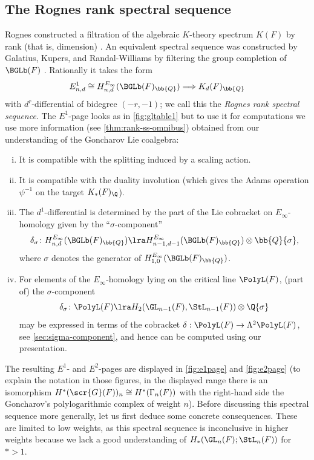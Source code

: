 \documentclass[a4paper]{amsart}
\begin{document}
\subsection{The Rognes rank spectral sequence} Rognes constructed a filtration of the algebraic $K$-theory spectrum $K(F)$ by rank (that is, dimension) \cite{Rognes}. An equivalent spectral sequence was constructed by Galatius, Kupers, and Randal-Williams by filtering the group completion of $\BGLb(F)$ \cite[Section 13.8]{GKRW18}. Rationally it takes the form
\[E^1_{n,d} \cong H^{E_\infty}_{n,d}(\BGLb(F)_\bb{Q}) \Longrightarrow K_d(F)_\bb{Q}\]
with $d^r$-differential of bidegree $(-r,-1)$; we call this the \emph{Rognes rank spectral sequence}. The $E^1$-page looks as in \cref{fig:gltable1} but to use it for computations we use more information (see \cref{thm:rank-ss-omnibus}) obtained from our understanding of the Goncharov Lie coalgebra:
\begin{enumerate}[(i)]
    \item It is compatible with the splitting induced by a scaling action.
    \item It is compatible with the duality involution (which gives the Adams operation $\psi^{-1}$ on the target $K_*(F)_\Q$).
    \item The $d^1$-differential is determined by the part of the Lie cobracket on $E_\infty$-homology given by the ``$\sigma$-component''
    \[\delta_\sigma \colon H^{E_\infty}_{n,d}(\BGLb(F)_\bb{Q}) \lra H^{E_\infty}_{n-1,d-1}(\BGLb(F)_\bb{Q}) \otimes \bb{Q}\{\sigma\},\]
    where $\sigma$ denotes the generator of $H^{E_\infty}_{1,0}(\BGLb(F)_\bb{Q})$.
    \item For elements of the $E_\infty$-homology lying on the critical line $\PolyL(F)$, (part of) the $\sigma$-component 
    \[\delta_\sigma \colon \PolyL(F) \lra H_2(\GL_{n-1}(F),\StL_{n-1}(F)) \otimes \Q\{\sigma\}\]
    may be expressed in terms of the cobracket $\delta: \PolyL(F) \to \Lambda^2 \PolyL(F)$, see \cref{sec:sigma-component}, and hence can be computed using our presentation. 
\end{enumerate}
The resulting $E^1$- and $E^2$-pages are displayed in \cref{fig:e1page} and \cref{fig:e2page} (to explain the notation in those figures, in the displayed range there is an isomorphism $H^*(\scr{G}(F))_n \cong H^*(\Gamma_n(F))$ with the right-hand side the Goncharov's polylogarithmic complex of weight $n$). Before discussing this spectral sequence more generally, let us first deduce some concrete consequences. These are limited to low weights, as this spectral sequence is inconclusive in higher weights because we lack a good understanding of $H_*(\GL_n(F);\StL_n(F))$ for $* > 1$.
\end{document}
